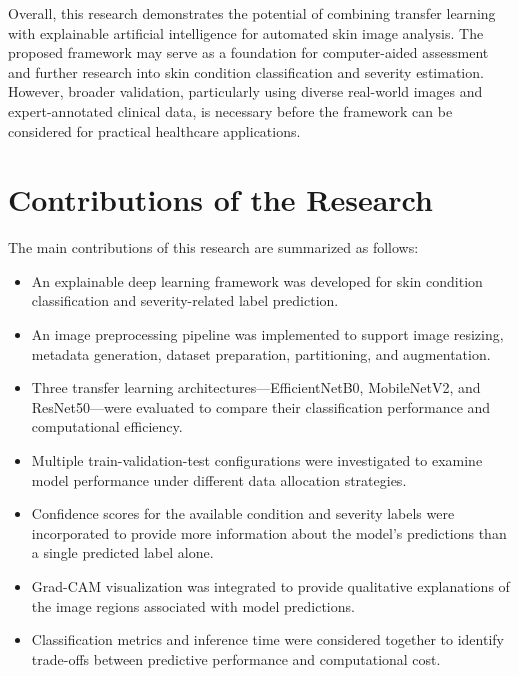 Overall, this research demonstrates the potential of combining transfer learning with explainable artificial intelligence for automated skin image analysis. The proposed framework may serve as a foundation for computer-aided assessment and further research into skin condition classification and severity estimation. However, broader validation, particularly using diverse real-world images and expert-annotated clinical data, is necessary before the framework can be considered for practical healthcare applications.

\section{Contributions of the Research}

The main contributions of this research are summarized as follows:

\begin{itemize}
    \item An explainable deep learning framework was developed for skin condition classification and severity-related label prediction.
    
    \item An image preprocessing pipeline was implemented to support image resizing, metadata generation, dataset preparation, partitioning, and augmentation.
    
    \item Three transfer learning architectures---EfficientNetB0, MobileNetV2, and ResNet50---were evaluated to compare their classification performance and computational efficiency.
    
    \item Multiple train-validation-test configurations were investigated to examine model performance under different data allocation strategies.
    
    \item Confidence scores for the available condition and severity labels were incorporated to provide more information about the model's predictions than a single predicted label alone.
    
    \item Grad-CAM visualization was integrated to provide qualitative explanations of the image regions associated with model predictions.
    
    \item Classification metrics and inference time were considered together to identify trade-offs between predictive performance and computational cost.
\end{itemize}

